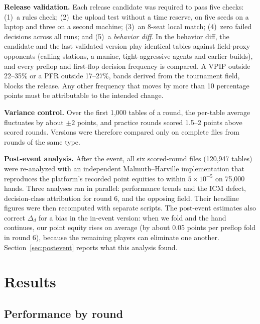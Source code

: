 \documentclass[10pt]{article}
\begin{document}
\textbf{Release validation.} Each release candidate was required to pass five checks: (1)~a rules check; (2)~the upload test without a time reserve, on five seeds on a laptop and three on a second machine; (3)~an 8-seat local match; (4)~zero failed decisions across all runs; and (5)~a \emph{behavior diff}. In the behavior diff, the candidate and the last validated version play identical tables against field-proxy opponents (calling stations, a maniac, tight-aggressive agents and earlier builds), and every preflop and first-flop decision frequency is compared. A VPIP outside 22--35\% or a PFR outside 17--27\%, bands derived from the tournament field, blocks the release. Any other frequency that moves by more than 10 percentage points must be attributable to the intended change.

\textbf{Variance control.} Over the first 1,000 tables of a round, the per-table average fluctuates by about $\pm2$ points, and practice rounds scored 1.5--2 points above scored rounds. Versions were therefore compared only on complete files from rounds of the same type.

\textbf{Post-event analysis.} After the event, all six scored-round files (120,947 tables) were re-analyzed with an independent Malmuth--Harville implementation that reproduces the platform's recorded point equities to within $5\times10^{-5}$ on 75,000 hands. Three analyses ran in parallel: performance trends and the ICM defect, decision-class attribution for round 6, and the opposing field. Their headline figures were then recomputed with separate scripts. The post-event estimates also correct $\Delta_d$ for a bias in the in-event version: when we fold and the hand continues, our point equity rises on average (by about 0.05 points per preflop fold in round 6), because the remaining players can eliminate one another. Section~\ref{sec:postevent} reports what this analysis found.

\section{Results}

\subsection{Performance by round}
\end{document}
